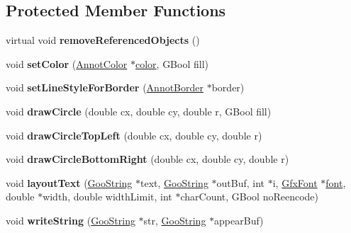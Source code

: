 \subsection*{Protected Member Functions}
\begin{DoxyCompactItemize}
\item 
\mbox{\label{class_annot_aed2f782de4fcfbe5b04e043a2175bbde}} 
virtual void {\bfseries remove\+Referenced\+Objects} ()
\item 
\mbox{\label{class_annot_a12190b54936f3a53ffa0aa08b94c7fd4}} 
void {\bfseries set\+Color} (\hyperlink{class_annot_color}{Annot\+Color} $\ast$\hyperlink{structcolor}{color}, G\+Bool fill)
\item 
\mbox{\label{class_annot_af912f8a67ea29736c2e58ac1643a99db}} 
void {\bfseries set\+Line\+Style\+For\+Border} (\hyperlink{class_annot_border}{Annot\+Border} $\ast$border)
\item 
\mbox{\label{class_annot_a1732c99ebdde65a589f227637259e5af}} 
void {\bfseries draw\+Circle} (double cx, double cy, double r, G\+Bool fill)
\item 
\mbox{\label{class_annot_a07504dd3faa94527feb730814142456d}} 
void {\bfseries draw\+Circle\+Top\+Left} (double cx, double cy, double r)
\item 
\mbox{\label{class_annot_a8446105cae8d6bc80e41af32487f7c99}} 
void {\bfseries draw\+Circle\+Bottom\+Right} (double cx, double cy, double r)
\item 
\mbox{\label{class_annot_ace4ea54668ef548bb8816f334810f329}} 
void {\bfseries layout\+Text} (\hyperlink{class_goo_string}{Goo\+String} $\ast$text, \hyperlink{class_goo_string}{Goo\+String} $\ast$out\+Buf, int $\ast$i, \hyperlink{class_gfx_font}{Gfx\+Font} $\ast$\hyperlink{structfont}{font}, double $\ast$width, double width\+Limit, int $\ast$char\+Count, G\+Bool no\+Reencode)
\item 
\mbox{\label{class_annot_a4759f8d870e61371f23836d59280f340}} 
void {\bfseries write\+String} (\hyperlink{class_goo_string}{Goo\+String} $\ast$str, \hyperlink{class_goo_string}{Goo\+String} $\ast$appear\+Buf)
\item 

\end{DoxyCompactItemize}
